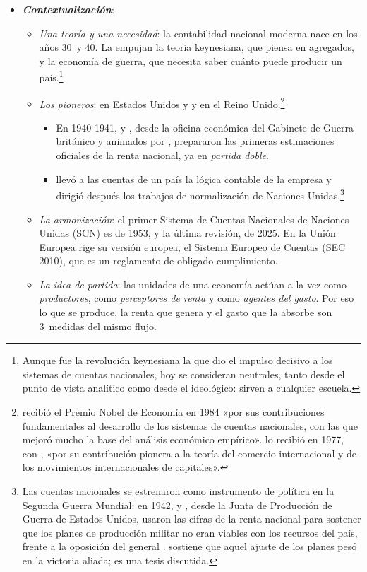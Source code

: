 \documentclass[11pt]{article}
\begin{document}
\begin{itemize}
\item \textbf{\emph{Contextualización}}:
  \begin{itemize}
  \item \emph{Una teoría y una necesidad}: la contabilidad nacional moderna nace en los años 30~y 40. La empujan la teoría keynesiana, que piensa en agregados, y la economía de guerra, que necesita saber cuánto puede producir un país.\footnote{Aunque fue la revolución keynesiana la que dio el impulso decisivo a los sistemas de cuentas nacionales, hoy se consideran neutrales, tanto desde el punto de vista analítico como desde el ideológico: sirven a cualquier escuela.}
  \item \emph{Los pioneros}:  en Estados Unidos y  y  en el Reino Unido.\footnote{ recibió el Premio Nobel de Economía en 1984 «por sus contribuciones fundamentales al desarrollo de los sistemas de cuentas nacionales, con las que mejoró mucho la base del análisis económico empírico»\nocite{Nobel1984Stone}.  lo recibió en 1977, con , «por su contribución pionera a la teoría del comercio internacional y de los movimientos internacionales de capitales»\nocite{Nobel1977Meade}.}
    \begin{itemize}
    \item En 1940-1941,  y , desde la oficina económica del Gabinete de Guerra británico y animados por , prepararon las primeras estimaciones oficiales de la renta nacional, ya en \emph{partida doble}\nocite{Nobel1977Meade,Nobel1984Stone}.
    \item {} llevó a las cuentas de un país la lógica contable de la empresa y dirigió después los trabajos de normalización de Naciones Unidas.\footnote{Las cuentas nacionales se estrenaron como instrumento de política en la Segunda Guerra Mundial: en 1942,  y , desde la Junta de Producción de Guerra de Estados Unidos, usaron las cifras de la renta nacional para sostener que los planes de producción militar no eran viables con los recursos del país, frente a la oposición del general . \textcite{Lacey2011} sostiene que aquel ajuste de los planes pesó en la victoria aliada; es una tesis discutida.}
    \end{itemize}
  \item \emph{La armonización}: el primer Sistema de Cuentas Nacionales de Naciones Unidas (SCN) es de 1953, y la última revisión, de 2025. En la Unión Europea rige su versión europea, el Sistema Europeo de Cuentas (SEC 2010), que es un reglamento de obligado cumplimiento\nocite{SEC2010,ONU2025SCN}.
  \item \emph{La idea de partida}: las unidades de una economía actúan a la vez como \emph{productores}, como \emph{perceptores de renta} y como \emph{agentes del gasto}. Por eso lo que se produce, la renta que genera y el gasto que la absorbe son 3~medidas del mismo flujo.
  \end{itemize}


\end{itemize}
\end{document}
